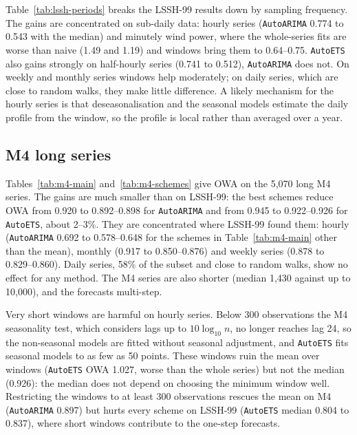 \documentclass[11pt]{article}
\begin{document}
Table~\ref{tab:lssh-periods} breaks the LSSH-99 results down by sampling
frequency. The gains are concentrated on sub-daily data: hourly series
(\texttt{AutoARIMA} 0.774 to 0.543 with the median) and minutely wind power,
where the whole-series fits are worse than naive (1.49 and 1.19) and windows
bring them to 0.64--0.75. \texttt{AutoETS} also gains strongly on half-hourly
series (0.741 to 0.512), \texttt{AutoARIMA} does not. On weekly and monthly
series windows help moderately; on daily series, which are close to random
walks, they make little difference. A likely mechanism for the hourly series is that deseasonalisation
and the seasonal models estimate the daily profile from the window, so the
profile is local rather than averaged over a year.

\begin{table}[t]
\centering\small
\caption{LSSH-99 by sampling frequency (seasonal period): relative MAE of the
whole series, the median over windows and inverse out-of-sample MSE weights.}
\label{tab:lssh-periods}

\end{table}

\subsection{M4 long series}

Tables~\ref{tab:m4-main} and~\ref{tab:m4-schemes} give OWA on the 5{,}070
long M4 series. The gains are much smaller than on LSSH-99: the best schemes
reduce OWA from 0.920 to 0.892--0.898 for \texttt{AutoARIMA} and from 0.945 to
0.922--0.926 for \texttt{AutoETS}, about 2--3\%. They are concentrated where
LSSH-99 found them: hourly (\texttt{AutoARIMA} 0.692 to 0.578--0.648 for the
schemes in Table~\ref{tab:m4-main} other than the mean), monthly (0.917 to
0.850--0.876) and weekly series (0.878 to 0.829--0.860). Daily series,
58\% of the subset and close to random walks, show no effect for any method.
The M4 series are also shorter (median 1{,}430 against up to 10{,}000), and the
forecasts multi-step.

Very short windows are harmful on hourly series. Below 300 observations the M4
seasonality test, which considers lags up to $10\log_{10}n$, no longer reaches
lag 24, so the non-seasonal models are fitted without seasonal adjustment, and
\texttt{AutoETS} fits seasonal models to as few as 50 points. These windows ruin
the mean over windows (\texttt{AutoETS} OWA 1.027, worse than the whole series)
but not the median (0.926): the median does not depend on choosing the minimum
window well. Restricting the windows to at least 300 observations rescues the
mean on M4 (\texttt{AutoARIMA} 0.897) but hurts every scheme on LSSH-99
(\texttt{AutoETS} median 0.804 to 0.837), where short windows contribute to the
one-step forecasts.
\end{document}
